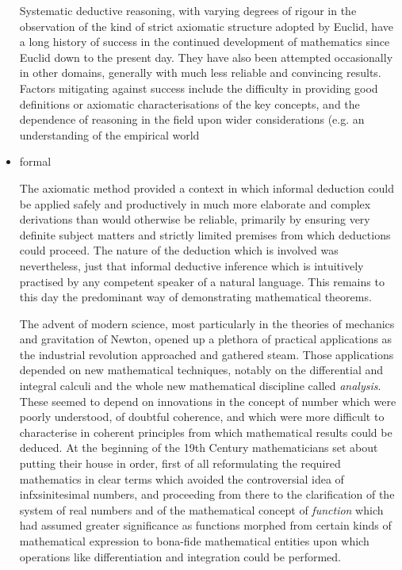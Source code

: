 \documentclass[10pt,titlepage]{book}
\begin{document}
\begin{itemize}
  Systematic deductive reasoning, with varying degrees of rigour in the observation of the kind of strict axiomatic structure adopted by Euclid, have a long history of success in the continued development of mathematics since Euclid down to the present day.
  They have also been attempted occasionally in other domains, generally with much less reliable and convincing results.
 Factors mitigating against success include the difficulty in providing good definitions or axiomatic characterisations of the key concepts, and the dependence of reasoning in the field upon wider considerations (e.g. an understanding of the empirical world
   
\item formal 

  The axiomatic method provided a context in which informal deduction could be applied safely and productively in much more elaborate and complex derivations than would otherwise be reliable, primarily by ensuring very definite subject matters and strictly limited premises from which deductions could proceed.
  The nature of the deduction which is involved was nevertheless, just that informal deductive inference which is intuitively practised by any competent speaker of a natural language.
  This remains to this day the predominant way of demonstrating mathematical theorems.

  The advent of modern science, most particularly in the theories of mechanics and gravitation of Newton, opened up a plethora of practical applications as the industrial revolution approached and gathered steam.
  Those applications depended on new mathematical techniques, notably on the differential and integral calculi and the whole new mathematical discipline called \emph{analysis}.
  These seemed to depend on innovations in the concept of number which were poorly understood, of doubtful coherence, and which were more difficult to characterise in coherent principles from which mathematical results could be deduced.
  At the beginning of the 19th Century mathematicians set about putting their house in order, first of all reformulating the required mathematics in clear terms which avoided the controversial idea of infxsinitesimal numbers, and proceeding from there to the clarification of the system of real numbers and of the mathematical concept of \emph{function} which had assumed greater significance as functions morphed from certain kinds of mathematical expression to bona-fide mathematical entities upon which operations like differentiation and integration could be performed.


\end{itemize}
\end{document}
